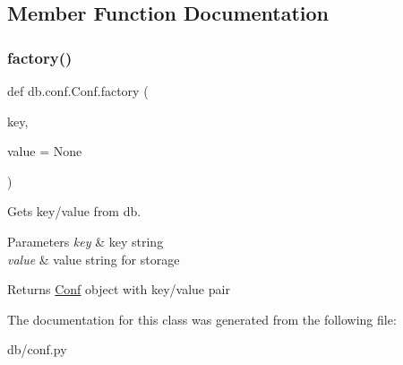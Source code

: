 \subsection{Member Function Documentation}
\mbox{\label{classdb_1_1conf_1_1_conf_a0e5941782c2bc7dea2350b235ba97597}} 
\subsubsection{\texorpdfstring{factory()}{factory()}}
{\footnotesize\ttfamily def db.\+conf.\+Conf.\+factory (\begin{DoxyParamCaption}\item[{}]{key,  }\item[{}]{value = {\ttfamily None} }\end{DoxyParamCaption})\hspace{0.3cm}{\ttfamily [static]}}



Gets key/value from db. 


\begin{DoxyParams}{Parameters}
{\em key} & key string \\
\hline
{\em value} & value string for storage \\
\hline
\end{DoxyParams}
\begin{DoxyReturn}{Returns}
\mbox{\hyperlink{classdb_1_1conf_1_1_conf}{Conf}} object with key/value pair 
\end{DoxyReturn}


The documentation for this class was generated from the following file\+:\begin{DoxyCompactItemize}
\item 
db/conf.\+py\end{DoxyCompactItemize}
